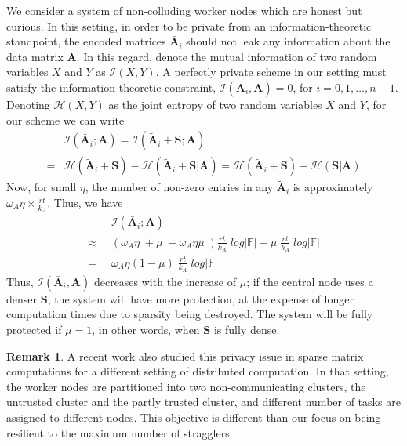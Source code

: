 \documentclass[conference]{IEEEtran}
\theoremstyle{definition}
\newtheorem{remark}{Remark}
\newcommand{\calH}{\mathcal{H}}
\newcommand{\calI}{\mathcal{I}}
\newcommand{\bfA}{\mathbf{A}}
\newcommand{\bfS}{\mathbf{S}}
\begin{document}
We consider a system of non-colluding worker nodes which are honest but curious. In this setting, in order to be private from an information-theoretic standpoint, the encoded matrices $\bar{\bfA}_i$ should not leak any information about the data matrix $\bfA$. In this regard, denote the mutual information of two random variables $X$ and $Y$ as $\calI(X, Y)$. A perfectly private scheme in our setting must satisfy the information-theoretic constraint, $\calI\left(\bar{\bfA}_i, \bfA \right) = 0$, for $i = 0, 1, \dots, n -1$. Denoting $\calH (X, Y)$  as the joint entropy of two random variables $X$ and $Y$, for our scheme we can write
\begin{align*}
    & \calI\left(\bar{\bfA}_i; \bfA \right)  =  \calI \left( \tilde{\bfA}_i + \bfS; \bfA \right) \nonumber \\ 
    = & \calH\left( \tilde{\bfA}_i + \bfS\right) - \calH\left( \tilde{\bfA}_i + \bfS | \bfA \right)  = \calH\left( \tilde{\bfA}_i + \bfS\right) - \calH\left( \bfS | \bfA \right)
\end{align*} Now, for small $\eta$, the number of non-zero entries in any $\tilde{\bfA}_i$ is approximately $\omega_A \eta \times \frac{rt}{k_A}$. Thus, we have
\begin{align}
\label{eq:sec}
    & \; \calI\left(\bar{\bfA}_i; \bfA \right) \nonumber \\
 \approx \; & \;{  \left( \omega_A\eta \; + \mu \; - \omega_A\eta \mu \;\right) \frac{rt}{k_A} \; log |\mathbb{F}|} - {\mu \; \frac{rt}{k_A} \; log |\mathbb{F}|} \nonumber \\
 = \; & \; \omega_A\eta \left( 1 - \mu \right)\; \frac{rt}{k_A} \; log |\mathbb{F}|
\end{align}
Thus, $\calI\left(\bar{\bfA}_i, \bfA \right)$ decreases with the increase of $\mu$; if the central node uses a denser $\bfS$, the system will have more protection, at the expense of longer computation times due to sparsity being destroyed. The system will be fully protected if $\mu = 1$, in other words, when $\bfS$ is fully dense. 

\begin{remark}
A recent work \cite{xhemrishi2022distributed} also studied this privacy issue in sparse matrix computations for a different setting of distributed computation. In that setting, the worker nodes are partitioned into two non-communicating clusters, the untrusted cluster and the partly trusted cluster, and different number of tasks are assigned to different nodes. This objective is different than our focus on being resilient to the maximum number of stragglers.
\end{remark}
\end{document}
